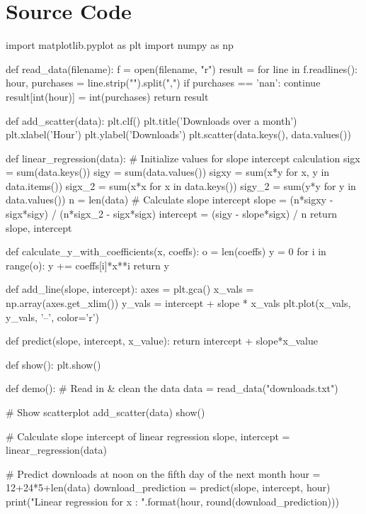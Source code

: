 \documentclass{article}
\begin{document}
\section{Source Code}

\begin{python}
import matplotlib.pyplot as plt
import numpy as np

def read_data(filename):
    f = open(filename, "r")
    result = {}
    for line in f.readlines():
        hour, purchases = line.strip("\n").split(",")
        if purchases == 'nan': continue
        result[int(hour)] = int(purchases)
    return result

def add_scatter(data):
    plt.clf()
    plt.title('Downloads over a month')
    plt.xlabel('Hour')
    plt.ylabel('Downloads')
    plt.scatter(data.keys(), data.values())
    
def linear_regression(data):
    # Initialize values for slope intercept calculation
    sigx = sum(data.keys())
    sigy = sum(data.values())
    sigxy = sum(x*y for x, y in data.items())
    sigx_2 = sum(x*x for x in data.keys())
    sigy_2 = sum(y*y for y in data.values())
    n = len(data)
    # Calculate slope intercept
    slope = (n*sigxy - sigx*sigy) / (n*sigx_2 - sigx*sigx)
    intercept = (sigy - slope*sigx) / n
    return slope, intercept

def calculate_y_with_coefficients(x, coeffs):
    o = len(coeffs)
    y = 0
    for i in range(o):
        y += coeffs[i]*x**i
    return y

def add_line(slope, intercept):
    axes = plt.gca()
    x_vals = np.array(axes.get_xlim())
    y_vals = intercept + slope * x_vals
    plt.plot(x_vals, y_vals, '--', color='r')

def predict(slope, intercept, x_value):
    return intercept + slope*x_value
    
def show():
    plt.show()

def demo():
    # Read in & clean the data
    data = read_data("downloads.txt")

    # Show scatterplot
    add_scatter(data)
    show()

    # Calculate slope intercept of linear regression
    slope, intercept = linear_regression(data)

    # Predict downloads at noon on the fifth day of the next month
    hour = 12+24*5+len(data)
    download_prediction = predict(slope, intercept, hour)
    print("Linear regression for x {}: {}".format(hour,
                        round(download_prediction)))


\end{python}
\end{document}
